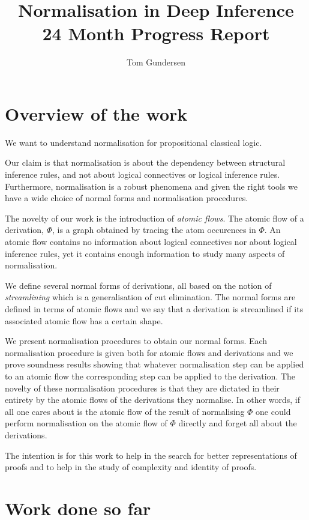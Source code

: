 \documentclass[]{article}
\title{Normalisation in Deep Inference \\ 24 Month Progress Report}
\author{Tom Gundersen}
\begin{document}
\maketitle

\section{Overview of the work}

We want to understand normalisation for propositional classical logic.

Our claim is that normalisation is about the dependency between structural inference rules, and not about logical connectives or logical inference rules. Furthermore, normalisation is a robust phenomena and given the right tools we have a wide choice of normal forms and normalisation procedures.

The novelty of our work is the introduction of \emph{atomic flows}. The atomic flow of a derivation, $\Phi$, is a graph obtained by tracing the atom occurences in $\Phi$. An atomic flow contains no information about logical connectives nor about logical inference rules, yet it contains enough information to study many aspects of normalisation.

We define several normal forms of derivations, all based on the notion of \emph{streamlining} which is a generalisation of cut elimination. The normal forms are defined in terms of atomic flows and we say that a derivation is streamlined if its associated atomic flow has a certain shape.

We present normalisation procedures to obtain our normal forms. Each normalisation procedure is given both for atomic flows and derivations and we prove soundness results showing that whatever normalisation step can be applied to an atomic flow the corresponding step can be applied to the derivation. The novelty of these normalisation procedures is that they are dictated in their entirety by the atomic flows of the derivations they normalise. In other words, if all one cares about is the atomic flow of the result of normalising $\Phi$ one could perform normalisation on the atomic flow of $\Phi$ directly and forget all about the derivations.

The intention is for this work to help in the search for better representations of proofs and to help in the study of complexity and identity of proofs.

\section{Work done so far}
\end{document}
